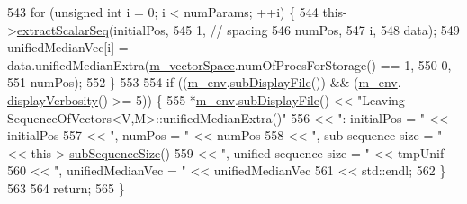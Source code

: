 \begin{DoxyCode}
543   \textcolor{keywordflow}{for} (\textcolor{keywordtype}{unsigned} \textcolor{keywordtype}{int} i = 0; i < numParams; ++i) \{
544     this->\hyperlink{class_q_u_e_s_o_1_1_sequence_of_vectors_ac977b3b26a6af2ae727671f1246262fd}{extractScalarSeq}(initialPos,
545                            1, \textcolor{comment}{// spacing}
546                            numPos,
547                            i,
548                            data);
549     unifiedMedianVec[i] = data.unifiedMedianExtra(\hyperlink{class_q_u_e_s_o_1_1_base_vector_sequence_a4bd171e39ed050ff105c808336f35198}{m\_vectorSpace}.numOfProcsForStorage() == 1,
550                                                   0,
551                                                   numPos);
552   \}
553 
554   \textcolor{keywordflow}{if} ((\hyperlink{class_q_u_e_s_o_1_1_base_vector_sequence_a8e8824d2a63c5a43bcc6473e3a0491e8}{m\_env}.\hyperlink{class_q_u_e_s_o_1_1_base_environment_a8a0064746ae8dddfece4229b9ad374d6}{subDisplayFile}()) && (\hyperlink{class_q_u_e_s_o_1_1_base_vector_sequence_a8e8824d2a63c5a43bcc6473e3a0491e8}{m\_env}.
      \hyperlink{class_q_u_e_s_o_1_1_base_environment_a1fe5f244fc0316a0ab3e37463f108b96}{displayVerbosity}() >= 5)) \{
555     *\hyperlink{class_q_u_e_s_o_1_1_base_vector_sequence_a8e8824d2a63c5a43bcc6473e3a0491e8}{m\_env}.\hyperlink{class_q_u_e_s_o_1_1_base_environment_a8a0064746ae8dddfece4229b9ad374d6}{subDisplayFile}() << \textcolor{stringliteral}{"Leaving SequenceOfVectors<V,M>::unifiedMedianExtra()"}
556                             << \textcolor{stringliteral}{": initialPos = "}            << initialPos
557                             << \textcolor{stringliteral}{", numPos = "}                << numPos
558                             << \textcolor{stringliteral}{", sub sequence size = "}     << this->
      \hyperlink{class_q_u_e_s_o_1_1_sequence_of_vectors_a0224bd3e961d86af5d2886301c0c2b86}{subSequenceSize}()
559                             << \textcolor{stringliteral}{", unified sequence size = "} << tmpUnif
560                             << \textcolor{stringliteral}{", unifiedMedianVec = "}      << unifiedMedianVec
561                             << std::endl;
562   \}
563 
564   \textcolor{keywordflow}{return};
565 \}
\end{DoxyCode}
